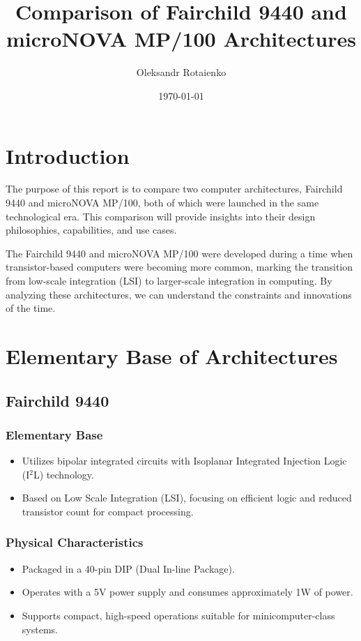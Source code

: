 \documentclass[a4paper,12pt]{article}
\title{Comparison of Fairchild 9440 and microNOVA MP/100 Architectures}
\author{Oleksandr Rotaienko}
\date{\today}
\begin{document}
\maketitle

\tableofcontents
\newpage

\section{Introduction}

The purpose of this report is to compare two computer architectures, Fairchild 9440 and microNOVA MP/100, both of which were launched in the same technological era. This comparison will provide insights into their design philosophies, capabilities, and use cases.

The Fairchild 9440 and microNOVA MP/100 were developed during a time when transistor-based computers were becoming more common, marking the transition from low-scale integration (LSI) to larger-scale integration in computing. By analyzing these architectures, we can understand the constraints and innovations of the time.

\section{Elementary Base of Architectures}

\subsection{Fairchild 9440}

\subsubsection{Elementary Base}
\begin{itemize}
    \item Utilizes bipolar integrated circuits with Isoplanar Integrated Injection Logic (I$^2$L) technology.
    \item Based on Low Scale Integration (LSI), focusing on efficient logic and reduced transistor count for compact processing.
\end{itemize}

\subsubsection{Physical Characteristics}
\begin{itemize}
    \item Packaged in a 40-pin DIP (Dual In-line Package).
    \item Operates with a 5V power supply and consumes approximately 1W of power.
    \item Supports compact, high-speed operations suitable for minicomputer-class systems.
\end{itemize}
\end{document}
